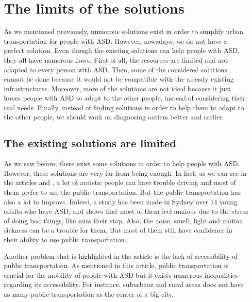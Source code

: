 \section{The limits of the solutions}
As we mentioned previously, numerous solutions exist in order to simplify urban transportation for people with ASD. However, nowadays, we do not have a perfect solution. Even though the existing solutions can help people with ASD, they all have numerous flaws. First of all, the resources are limited and not adapted to every person with ASD. Then, some of the considered solutions cannot be done because it would not be compatible with the already existing infrastructures. Moreover, more of the solutions are not ideal because it just forces people with ASD to adapt to the other people, instead of considering their real needs. Finally, instead of finding solutions in order to help them to adapt to the other people, we should work on diagnosing autism better and earlier.
\subsection{The existing solutions are limited}
As we saw before, there exist some solutions in order to help people with ASD. However, these solutions are very far from being enough. In fact, as we can see in the articles \cite{2015ViewpointsAdultsAutism} and \cite{2021DevelopingCommunityMobility}, a lot of autistic people can have trouble driving and most of them prefer to use the public transportation. But the public transportation has also a lot to improve. Indeed, a study has been made in Sydney \cite{2020ExperiencesYoungAutistic} over 14 young adults who have ASD, and shows that most of them feel anxious due to the stress of doing bad things, like miss their stop. Also, the noise, smell, light and motion sickness can be a trouble for them. But most of them still have confidence in their ability to use public transportation.

Another problem that is highlighted in the article \cite{2015DetourRightPlace} is the lack of accessibility of public transportation. As mentioned in this article, public transportation is crucial for the mobility of people with ASD but it exists numerous inequalities regarding its accessibility. For instance, suburbans and rural areas does not have as many public transportation as the center of a big city.

